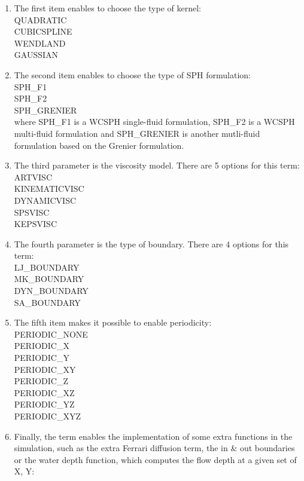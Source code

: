 \documentclass{../GPUSPHtemplate}
\begin{document}
\begin{enumerate}
\item The first item enables to choose the type of kernel:\\
QUADRATIC\\
CUBICSPLINE\\
WENDLAND\\
GAUSSIAN\\
\item The second item enables to choose the type of SPH formulation:\\
SPH\_F1\\
SPH\_F2\\
SPH\_GRENIER\\
where SPH\_F1 is a WCSPH single-fluid formulation, SPH\_F2 is a WCSPH multi-fluid formulation and
SPH\_GRENIER is another mutli-fluid formulation based on the Grenier formulation.
\item The third parameter is the viscosity model. There are 5 options for this term: \\
ARTVISC\\
KINEMATICVISC\\
DYNAMICVISC\\
SPSVISC\\
KEPSVISC\\
\item The fourth parameter is the type of boundary. There are 4 options for this term:\\
LJ\_BOUNDARY\\
MK\_BOUNDARY\\
DYN\_BOUNDARY\\
SA\_BOUNDARY\\
\item The fifth item makes it possible to enable periodicity:\\
  PERIODIC\_NONE \\
  PERIODIC\_X \\
  PERIODIC\_Y \\
  PERIODIC\_XY \\
  PERIODIC_Z \\
  PERIODIC_XZ \\
  PERIODIC_YZ \\
  PERIODIC_XYZ \\
\item Finally, the  term enables the implementation 
of some extra functions in the simulation, such as the extra Ferrari diffusion term, 
the in \& out boundaries or the water depth function, 
which computes the flow depth at a given set of X, Y:\\

\end{enumerate}
\end{document}
